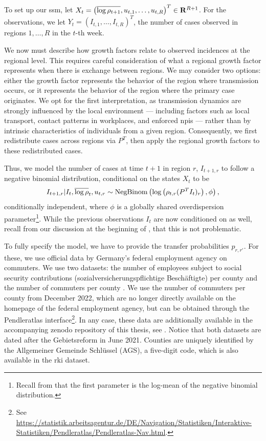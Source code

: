 To set up our \gls{ssm}, let $X_{t} = \left( \overline{\log \rho_{t + 1}}, u_{t, 1}, \dots, u_{t, R} \right)^{T} \in \mathbf R^{R + 1}$. For the observations, we let $Y_{t} = \left( I_{t, 1}, \dots, I_{t, R} \right)^{T}$, the number of cases observed in regions $1, \dots, R$ in the $t$-th week. 

We now must describe how growth factors relate to observed incidences at the regional level. This requires careful consideration of what a regional growth factor represents when there is exchange between regions. We may consider two options: either the growth factor represents the behavior of the region where transmission occurs, or it represents the behavior of the region where the primary case originates. We opt for the first interpretation, as transmission dynamics are strongly influenced by the local environment --- including factors such as local transport, contact patterns in workplaces, and enforced \glspl{npi} --- rather than by intrinsic characteristics of individuals from a given region. Consequently, we first redistribute cases across regions via $P^{T}$, then apply the regional growth factors to these redistributed cases.

Thus, we model the number of cases at time $t + 1$ in region $r$, $I_{t+1, r}$ to follow a negative binomial distribution, conditional on the states $X_{t}$ to be
$$
    I_{t+1,r} | I_{t}, \overline{\log\rho}_{t}, u_{t,r} \sim \operatorname{NegBinom} \left( \log \left(\rho_{t,r} (P^{T}I_t)_{r}\right), \phi\right),
$$
conditionally independent, where $\phi$ is a globally shared overdispersion parameter\footnote{Recall from  that the first parameter is the log-mean of the negative binomial distribution.}. While the previous observations $I_{t}$ are now conditioned on as well, recall from our discussion at the beginning of , that this is not problematic.

To fully specify the model, we have to provide the transfer probabilities $p_{r,r'}$. For these, we use official data by Germany's federal employment agency on commuters. We use two datasets: the number of employees subject to social security contributions (sozialversicherungspflichtige Beschäftigte) per county \citep{BundesagenturfuerArbeitStatistik2021Sozialversicherungspflichtig} and the number of commuters per county  \citep{BundesagenturfuerArbeitStatistik2024Pendleratlas}. We use the number of commuters per county from December 2022, which are no longer directly available on the homepage of the federal employment agency, but can be obtained through the Pendleratlas interface\footnote{See \url{https://statistik.arbeitsagentur.de/DE/Navigation/Statistiken/Interaktive-Statistiken/Pendleratlas/Pendleratlas-Nav.html}.}. In any case, these data are additionally available in the accompanying zenodo repository of this thesis, see . Notice that both datasets are dated after the Gebietsreform in June 2021. Counties are uniquely identified by the Allgemeiner Gemeinde Schlüssel (AGS), a five-digit code, which is also available in the \gls{rki} dataset. 

